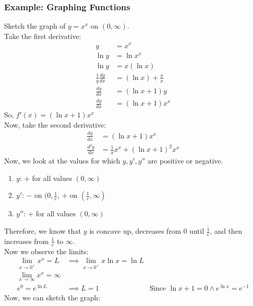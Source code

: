 \documentclass{article}
\begin{document}
\subsubsection{Example: Graphing Functions}
Sketch the graph of $y = x^x$ on $(0, \infty)$.\\
Take the first derivative:
\begin{align*}
    y & = x^x\\
    \ln y & = \ln x^x\\
    \ln y & = x (\ln x)\\
    \frac{1}{y} \frac{dy}{dx} & = (\ln x) + \frac{x}{x}\\
    \frac{dy}{dx} & = (\ln x + 1)y\\
    \frac{dy}{dx} & = (\ln x + 1)x^x
\end{align*}
So, $f'(x) = (\ln x + 1)x^x$\\
Now, take the second derivative:
\begin{align*}
    \frac{dy}{dx} & = (\ln x + 1)x^x\\
    \frac{d^2y}{dx} & = \frac{1}{x}x^x + (\ln x + 1)^2 x^x
\end{align*}
Now, we look at the values for which $y, y', y''$ are positive or negative.
\begin{enumerate}
    \item $y$: $+$ for all values $(0, \infty)$
    \item $y'$: $-$ on $(0, \frac{1}{e}$, $+$ on $(\frac{1}{e}, \infty)$
    \item $y''$: $+$ for all values $(0, \infty)$
\end{enumerate}
Therefore, we know that $y$ is concave up, decreases from $0$ until $\frac{1}{e}$, and then increases from $\frac{1}{e}$ to $\infty$.\\
Now we observe the limits:
\begin{align*}
    \lim_{x \to 0^+} x^x = L & \implies \lim_{x \to 0^+} x \ln x = \ln L\\
    \lim_{x \to \infty} x^x = \infty\\
    e^0 = e^{\ln L} & \implies L = 1 & \text{Since }\ln x + 1 = 0 \land e^{\ln x} = e^{-1}
\end{align*}
Now, we can sketch the graph:
\end{document}

